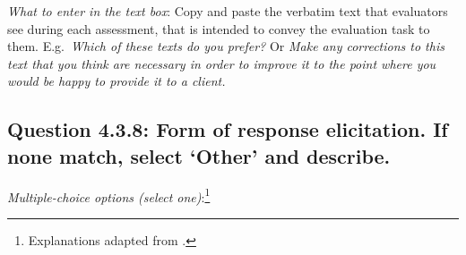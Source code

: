 \documentclass[11pt,a4paper]{article}
\begin{document}
\noindent\textit{What to enter in the text box}:  Copy and paste the verbatim text that evaluators see during each assessment, that is intended to convey the evaluation task to them. E.g.\ \textit{Which of these texts do you prefer?} Or \textit{Make any corrections to this text that you think are necessary in order to improve it to the point where you would be happy to provide it to a client.} 

\subsection*{Question 4.3.8:  Form of response elicitation. If none match, select `Other' and describe.}

\noindent\textit{Multiple-choice options (select one)}:\footnote{Explanations adapted from \citet{howcroft-etal-2020-twenty}.}
\vspace{-.1cm}
\end{document}
